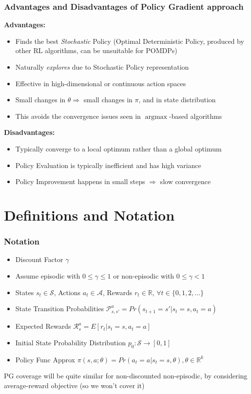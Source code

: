 \documentclass[handout]{beamer}
\DeclareMathOperator*{\argmax}{argmax}
\begin{document}
\begin{frame}
\frametitle{Advantages and Disadvantages of Policy Gradient approach}
\pause
{\bf Advantages:}
\begin{itemize}[<+->]
\item Finds the best {\em Stochastic} Policy (Optimal Deterministic Policy, produced by other RL algorithms, can be unsuitable for POMDPs)
\item Naturally {\em explores} due to Stochastic Policy representation
\item Effective in high-dimensional or continuous action spaces
\item Small changes in $\theta \Rightarrow$ small changes in $\pi$, and in state distribution
\item This avoids the convergence issues seen in $\argmax$-based algorithms 
\end{itemize}
{\bf Disadvantages:}
\begin{itemize}[<+->]
\item Typically converge to a local optimum rather than a global optimum
\item Policy Evaluation is typically inefficient and has high variance
\item Policy Improvement happens in small steps $\Rightarrow$ slow convergence
\end{itemize}
\end{frame}

\section{Definitions and Notation}

\begin{frame}
\frametitle{Notation}
\pause
\begin{itemize}[<+->]
\item Discount Factor $\gamma$
\item Assume episodic with $0 \leq \gamma \leq1$ or non-episodic with $0 \leq \gamma < 1$
\item States $s_t \in \mathcal{S}$, Actions $a_t \in \mathcal{A}$, Rewards $r_t \in \mathbb{R}$, $\forall t \in \{0, 1, 2, \ldots\}$
\item State Transition Probabilities $\mathcal{P}_{s,s'}^a = Pr(s_{t+1}=s'|s_t=s,a_t=a)$
\item Expected Rewards $\mathcal{R}_s^a = E[r_t | s_t=s,a_t=a]$
\item Initial State Probability Distribution $p_0 : \mathcal{S} \rightarrow [0,1]$
\item Policy Func Approx $\pi(s,a;\theta) = Pr(a_t=a | s_t=s,\theta), \theta \in \mathbb{R}^k$
\end{itemize}
\pause
PG coverage will be quite similar for non-discounted non-episodic, by considering average-reward objective (so we won't cover it)
\end{frame}
\end{document}
